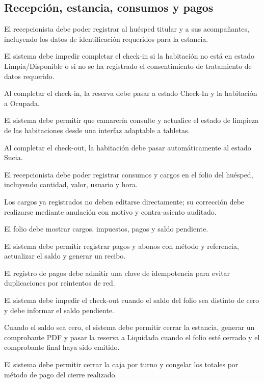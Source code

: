 \documentclass[12pt,a4paper]{article}
\newcommand{\RF}[2]{\item[\textbf{#1}] #2}
\begin{document}
\subsection{Recepción, estancia, consumos y pagos}
\begin{description}[leftmargin=2.1cm,style=nextline]
  \RF{RF-30}{El recepcionista debe poder registrar al huésped titular y a sus acompañantes, incluyendo los datos de identificación requeridos para la estancia.}
  \RF{RF-31}{El sistema debe impedir completar el check-in si la habitación no está en estado Limpia/Disponible o si no se ha registrado el consentimiento de tratamiento de datos requerido.}
  \RF{RF-32}{Al completar el check-in, la reserva debe pasar a estado Check-In y la habitación a Ocupada.}
  \RF{RF-33}{El sistema debe permitir que camarería consulte y actualice el estado de limpieza de las habitaciones desde una interfaz adaptable a tabletas.}
  \RF{RF-34}{Al completar el check-out, la habitación debe pasar automáticamente al estado Sucia.}
  \RF{RF-35}{El recepcionista debe poder registrar consumos y cargos en el folio del huésped, incluyendo cantidad, valor, usuario y hora.}
  \RF{RF-36}{Los cargos ya registrados no deben editarse directamente; su corrección debe realizarse mediante anulación con motivo y contra-asiento auditado.}
  \RF{RF-37}{El folio debe mostrar cargos, impuestos, pagos y saldo pendiente.}
  \RF{RF-38}{El sistema debe permitir registrar pagos y abonos con método y referencia, actualizar el saldo y generar un recibo.}
  \RF{RF-39}{El registro de pagos debe admitir una clave de idempotencia para evitar duplicaciones por reintentos de red.}
  \RF{RF-40}{El sistema debe impedir el check-out cuando el saldo del folio sea distinto de cero y debe informar el saldo pendiente.}
  \RF{RF-41}{Cuando el saldo sea cero, el sistema debe permitir cerrar la estancia, generar un comprobante PDF y pasar la reserva a Liquidada cuando el folio esté cerrado y el comprobante final haya sido emitido.}
  \RF{RF-42}{El sistema debe permitir cerrar la caja por turno y congelar los totales por método de pago del cierre realizado.}
\end{description}
\end{document}
